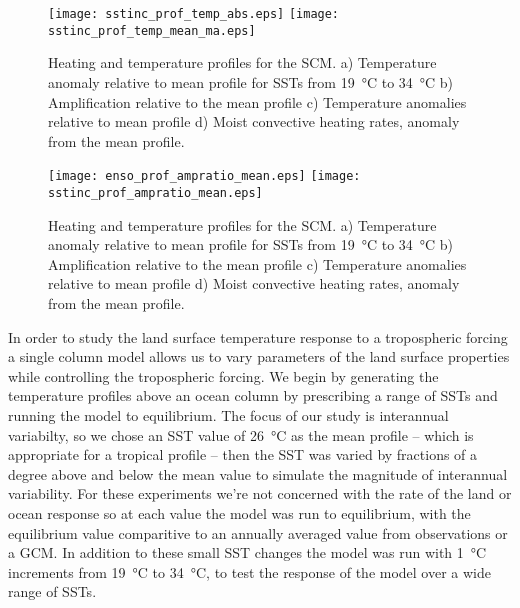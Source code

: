 \begin{figure}[ht]
\texttt{[image: sstinc\_prof\_temp\_abs.eps]}
\texttt{[image: sstinc\_prof\_temp\_mean\_ma.eps]}
\caption{Heating and temperature profiles for the SCM. a) Temperature anomaly 
	relative to mean profile for SSTs from \SI{19}{\degreeCelsius} to 
	\SI{34}{\degreeCelsius} b) Amplification relative to the mean profile c) 
	Temperature anomalies relative to mean profile d) Moist convective heating 
rates, anomaly from the mean profile.}
\label{fig:scmsstprof}
\end{figure}

\begin{figure}[ht]
\texttt{[image: enso\_prof\_ampratio\_mean.eps]}
\texttt{[image: sstinc\_prof\_ampratio\_mean.eps]}\\
\caption{Heating and temperature profiles for the SCM. a) Temperature anomaly 
	relative to mean profile for SSTs from \SI{19}{\degreeCelsius} to 
	\SI{34}{\degreeCelsius} b) Amplification relative to the mean profile c) 
	Temperature anomalies relative to mean profile d) Moist convective heating 
rates, anomaly from the mean profile.}
\label{fig:scmsstprof}
\end{figure}

In order to study the land surface temperature response to a tropospheric 
forcing a single column model allows us to vary parameters of the land surface 
properties while controlling the tropospheric forcing.  We begin by generating 
the temperature profiles above an ocean column by prescribing a range of SSTs 
and running the model to equilibrium.  The focus of our study is interannual 
variabilty, so we chose an SST value of \SI{26}{\degreeCelsius} as the mean 
profile -- which is appropriate for a tropical profile -- then the SST was 
varied by fractions of a degree above and below the mean value to simulate the 
magnitude of interannual variability. For these experiments we're not concerned 
with the rate of the land or ocean response so at each value the model was run 
to equilibrium, with the equilibrium value comparitive to an annually averaged 
value from observations or a GCM.  In addition to these small SST changes the 
model was run with \SI{1}{\degreeCelsius} increments from 
\SI{19}{\degreeCelsius} to \SI{34}{\degreeCelsius}, to test the response of the 
model over a wide range of SSTs.


